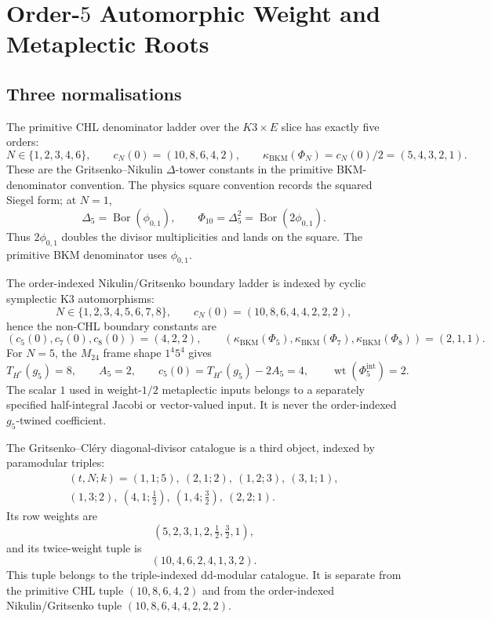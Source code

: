 \providecommand{\Sp}{\mathrm{Sp}}
\providecommand{\Mp}{\mathrm{Mp}}
\providecommand{\Aut}{\mathrm{Aut}}
\providecommand{\Z}{\mathbb{Z}}
\providecommand{\C}{\mathbb{C}}
\providecommand{\cO}{\mathcal{O}}
\providecommand{\DT}{\mathrm{DT}}
\providecommand{\red}{\mathrm{red}}
\providecommand{\kBKM}{\kappa_{\mathrm{BKM}}}
\providecommand{\kch}{\kappa_{\mathrm{ch}}}
\providecommand{\kcat}{\kappa_{\mathrm{cat}}}
\providecommand{\kfib}{\kappa_{\mathrm{fiber}}}
\providecommand{\wt}{\operatorname{wt}}

\section{Order-$5$ Automorphic Weight and Metaplectic Roots}
\label{sec:lorgat-N5-metaplectic}

\subsection*{Three normalisations}

The primitive CHL denominator ladder over the \(K3\times E\) slice has
exactly five orders:
\[
  N\in\{1,2,3,4,6\},\qquad
  c_N(0)=(10,8,6,4,2),\qquad
  \kBKM(\Phi_N)=c_N(0)/2=(5,4,3,2,1).
\]
These are the Gritsenko--Nikulin \(\Delta\)-tower constants in the
primitive BKM-denominator convention.  The physics square convention
records the squared Siegel form; at \(N=1\),
\[
  \Delta_5=\operatorname{Bor}(\phi_{0,1}),\qquad
  \Phi_{10}=\Delta_5^2=\operatorname{Bor}(2\phi_{0,1}).
\]
Thus \(2\phi_{0,1}\) doubles the divisor multiplicities and lands on
the square.  The primitive BKM denominator uses \(\phi_{0,1}\).

The order-indexed Nikulin/Gritsenko boundary ladder is indexed by
cyclic symplectic K3 automorphisms:
\[
  N\in\{1,2,3,4,5,6,7,8\},\qquad
  c_N(0)=(10,8,6,4,4,2,2,2),
\]
hence the non-CHL boundary constants are
\[
  (c_5(0),c_7(0),c_8(0))=(4,2,2),\qquad
  (\kBKM(\Phi_5),\kBKM(\Phi_7),\kBKM(\Phi_8))=(2,1,1).
\]
For \(N=5\), the \(M_{24}\) frame shape \(1^4 5^4\) gives
\[
  T_{H^*}(g_5)=8,\qquad A_5=2,\qquad
  c_5(0)=T_{H^*}(g_5)-2A_5=4,\qquad
  \wt(\Phi_5^{\mathrm{int}})=2.
\]
The scalar \(1\) used in weight-\(1/2\) metaplectic inputs belongs to a
separately specified half-integral Jacobi or vector-valued input.  It
is never the order-indexed \(g_5\)-twined coefficient.

The Gritsenko--Cl\'ery diagonal-divisor catalogue is a third object,
indexed by paramodular triples:
\[
\begin{gathered}
 (t,N;k)=
 (1,1;5),\ (2,1;2),\ (1,2;3),\ (3,1;1),\\
 (1,3;2),\ (4,1;\tfrac12),\ (1,4;\tfrac32),\ (2,2;1).
\end{gathered}
\]
Its row weights are
\[
  (5,2,3,1,2,\tfrac12,\tfrac32,1),
\]
and its twice-weight tuple is
\[
  (10,4,6,2,4,1,3,2).
\]
This tuple belongs to the triple-indexed dd-modular catalogue.  It is
separate from the primitive CHL tuple
\((10,8,6,4,2)\) and from the order-indexed Nikulin/Gritsenko tuple
\((10,8,6,4,4,2,2,2)\).

